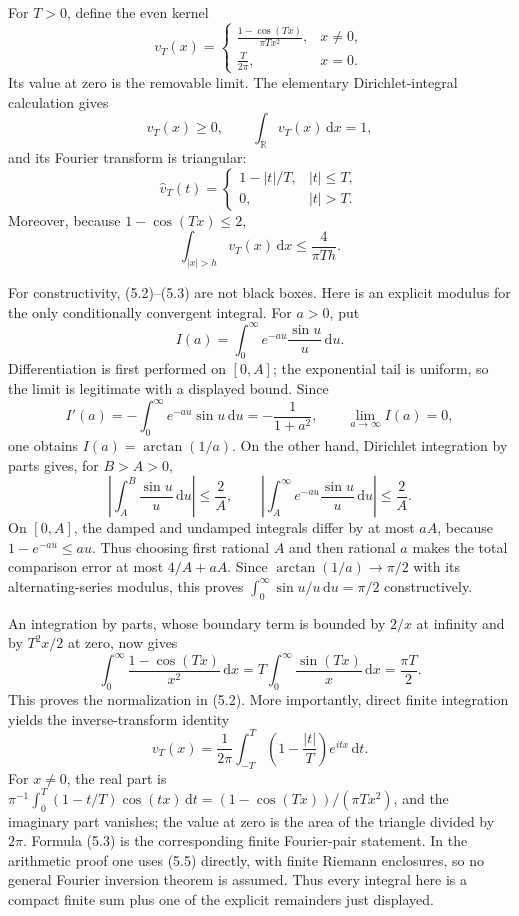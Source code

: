\documentclass[11pt]{article}
\newcommand{\R}{\mathbb R}
\newcommand{\dd}{\,\mathrm d}
\begin{document}
For \(T>0\), define the even kernel
\[
 v_T(x)=
 \begin{cases}
 \displaystyle\frac{1-\cos(Tx)}{\pi T x^2},&x\ne0,\\[0.7em]
 \displaystyle\frac{T}{2\pi},&x=0.
 \end{cases}                                           \tag{5.1}
\]
Its value at zero is the removable limit.  The elementary Dirichlet-integral
calculation gives
\[
 v_T(x)\ge0,\qquad \int_{\R}v_T(x)\dd x=1,             \tag{5.2}
\]
and its Fourier transform is triangular:
\[
 \widehat v_T(t)=
 \begin{cases}
 1-|t|/T,&|t|\le T,\\
 0,&|t|>T.
 \end{cases}                                           \tag{5.3}
\]
Moreover, because \(1-\cos(Tx)\le2\),
\[
 \int_{|x|>h}v_T(x)\dd x\le\frac4{\pi T h}.           \tag{5.4}
\]

For constructivity, (5.2)--(5.3) are not black boxes.  Here is an
explicit modulus for the only conditionally convergent integral.  For
\(a>0\), put
\[
 I(a)=\int_0^\infty e^{-au}\frac{\sin u}{u}\dd u.
\]
Differentiation is first performed on \([0,A]\); the exponential tail is
uniform, so the limit is legitimate with a displayed bound.  Since
\[
 I'(a)=-\int_0^\infty e^{-au}\sin u\dd u
       =-\frac1{1+a^2},
 \qquad \lim_{a\to\infty}I(a)=0,
\]
one obtains \(I(a)=\arctan(1/a)\).  On the other hand, Dirichlet integration
by parts gives, for \(B>A>0\),
\[
 \left|\int_A^B\frac{\sin u}{u}\dd u\right|\le\frac2A,
 \qquad
 \left|\int_A^\infty e^{-au}\frac{\sin u}{u}\dd u\right|
 \le\frac2A.
\]
On \([0,A]\), the damped and undamped integrals differ by at most \(aA\),
because \(1-e^{-au}\le au\).  Thus choosing first rational \(A\) and then
rational \(a\) makes the total comparison error at most
\(4/A+aA\).  Since \(\arctan(1/a)\to\pi/2\) with its alternating-series
modulus, this proves
\(\int_0^\infty\sin u/u\dd u=\pi/2\) constructively.

An integration by parts, whose boundary term is bounded by \(2/x\) at
infinity and by \(T^2x/2\) at zero, now gives
\[
 \int_0^\infty\frac{1-\cos(Tx)}{x^2}\dd x
 =T\int_0^\infty\frac{\sin(Tx)}x\dd x
 =\frac{\pi T}{2}.
\]
This proves the normalization in (5.2).  More importantly, direct finite
integration yields the inverse-transform identity
\[
 v_T(x)=\frac1{2\pi}\int_{-T}^{T}
       \left(1-\frac{|t|}{T}\right)e^{itx}\dd t.     \tag{5.5}
\]
For \(x\ne0\), the real part is
\(\pi^{-1}\int_0^T(1-t/T)\cos(tx)\dd t
 =(1-\cos(Tx))/(\pi T x^2)\), and the imaginary part vanishes; the value at
zero is the area of the triangle divided by \(2\pi\).  Formula (5.3) is the
corresponding finite Fourier-pair statement.  In the arithmetic proof one
uses (5.5) directly, with finite Riemann enclosures, so no general Fourier
inversion theorem is assumed.  Thus every integral here is a compact finite
sum plus one of the explicit remainders just displayed.
\end{document}
